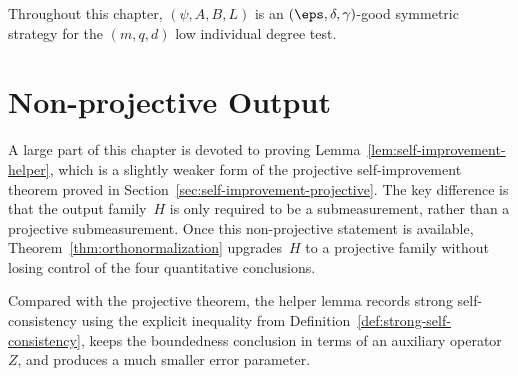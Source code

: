 Throughout this chapter, $(\psi,A,B,L)$ is an $(\eps,\delta,\gamma)$-good symmetric strategy for the $(m,q,d)$ low individual degree test.

\section{Non-projective Output}
\label{sec:self-improvement}

A large part of this chapter is devoted to proving
Lemma~\ref{lem:self-improvement-helper}, which is a slightly weaker form of the
projective self-improvement theorem proved in Section~\ref{sec:self-improvement-projective}.
The key difference is that the output family~$H$ is only required to be a
submeasurement, rather than a projective submeasurement. Once this non-projective
statement is available, Theorem~\ref{thm:orthonormalization} upgrades~$H$ to a
projective family without losing control of the four quantitative conclusions.

Compared with the projective theorem, the helper lemma records strong
self-consistency using the explicit inequality from
Definition~\ref{def:strong-self-consistency}, keeps the boundedness conclusion in
terms of an auxiliary operator~$Z$, and produces a much smaller error parameter.

